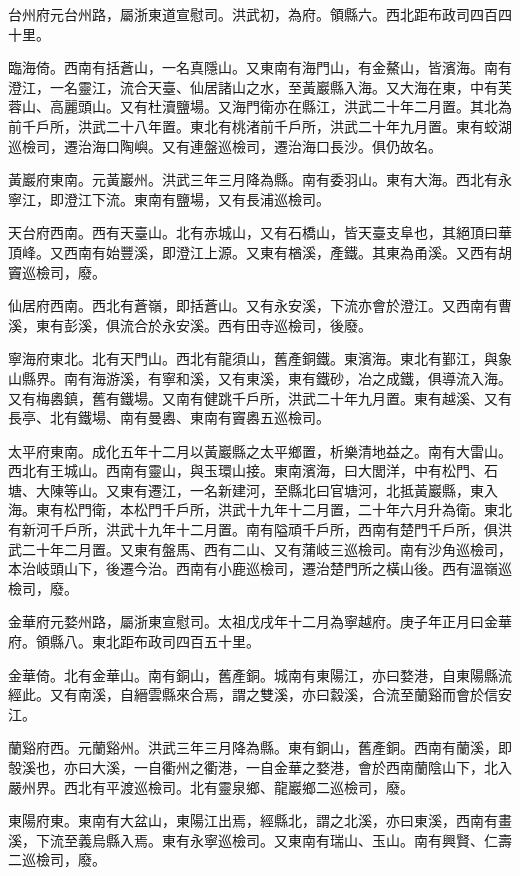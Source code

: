 台州府元台州路，屬浙東道宣慰司。洪武初，為府。領縣六。西北距布政司四百四十里。

臨海倚。西南有括蒼山，一名真隱山。又東南有海門山，有金鰲山，皆濱海。南有澄江，一名靈江，流合天臺、仙居諸山之水，至黃巖縣入海。又大海在東，中有芙蓉山、高麗頭山。又有杜瀆鹽場。又海門衛亦在縣江，洪武二十年二月置。其北為前千戶所，洪武二十八年置。東北有桃渚前千戶所，洪武二十年九月置。東有蛟湖巡檢司，遷治海口陶嶼。又有連盤巡檢司，遷治海口長沙。俱仍故名。

黃巖府東南。元黃巖州。洪武三年三月降為縣。南有委羽山。東有大海。西北有永寧江，即澄江下流。東南有鹽場，又有長浦巡檢司。

天台府西南。西有天臺山。北有赤城山，又有石橋山，皆天臺支阜也，其絕頂曰華頂峰。又西南有始豐溪，即澄江上源。又東有楢溪，產鐵。其東為甬溪。又西有胡竇巡檢司，廢。

仙居府西南。西北有蒼嶺，即括蒼山。又有永安溪，下流亦會於澄江。又西南有曹溪，東有彭溪，俱流合於永安溪。西有田寺巡檢司，後廢。

寧海府東北。北有天門山。西北有龍須山，舊產銅鐵。東濱海。東北有鄞江，與象山縣界。南有海游溪，有寧和溪，又有東溪，東有鐵砂，冶之成鐵，俱導流入海。又有梅嶴鎮，舊有鐵場。又南有健跳千戶所，洪武二十年九月置。東有越溪、又有長亭、北有鐵場、南有曼嶴、東南有竇嶴五巡檢司。

太平府東南。成化五年十二月以黃巖縣之太平鄉置，析樂清地益之。南有大雷山。西北有王城山。西南有靈山，與玉環山接。東南濱海，曰大閭洋，中有松門、石塘、大陳等山。又東有遷江，一名新建河，至縣北曰官塘河，北抵黃巖縣，東入海。東有松門衛，本松門千戶所，洪武十九年十二月置，二十年六月升為衛。東北有新河千戶所，洪武十九年十二月置。南有隘頑千戶所，西南有楚門千戶所，俱洪武二十年二月置。又東有盤馬、西有二山、又有蒲岐三巡檢司。南有沙角巡檢司，本治岐頭山下，後遷今治。西南有小鹿巡檢司，遷治楚門所之橫山後。西有溫嶺巡檢司，廢。

金華府元婺州路，屬浙東宣慰司。太祖戊戌年十二月為寧越府。庚子年正月曰金華府。領縣八。東北距布政司四百五十里。

金華倚。北有金華山。南有銅山，舊產銅。城南有東陽江，亦曰婺港，自東陽縣流經此。又有南溪，自縉雲縣來合焉，謂之雙溪，亦曰縠溪，合流至蘭谿而會於信安江。

蘭谿府西。元蘭谿州。洪武三年三月降為縣。東有銅山，舊產銅。西南有蘭溪，即彀溪也，亦曰大溪，一自衢州之衢港，一自金華之婺港，會於西南蘭陰山下，北入嚴州界。西北有平渡巡檢司。北有靈泉鄉、龍巖鄉二巡檢司，廢。

東陽府東。東南有大盆山，東陽江出焉，經縣北，謂之北溪，亦曰東溪，西南有畫溪，下流至義烏縣入焉。東有永寧巡檢司。又東南有瑞山、玉山。南有興賢、仁壽二巡檢司，廢。

